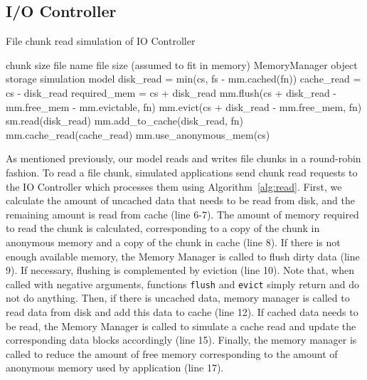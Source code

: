 \documentclass[conference]{IEEEtran}
\newcommand{\Desc}[2]{\State \makebox[2em][l]{#1}#2}
\begin{document}
    \subsection{I/O Controller}
     
    \begin{algorithm}\caption{File chunk read simulation of IO Controller}
    \label{alg:read}
        \small
        \begin{algorithmic}[1]
            \Input
                \Desc{cs}{chunk size}
                \Desc{fn}{file name}
                \Desc{fs}{file size (assumed to fit in memory)}
                \Desc{mm}{MemoryManager object}
                \Desc{sm}{storage simulation model}
               \EndInput
               \State disk\_read = min(cs, fs - mm.cached(fn)) 
               \State cache\_read = cs - disk\_read 
               \State required\_mem = cs + disk\_read
               \State mm.flush(cs + disk\_read - mm.free\_mem - mm.evictable, fn) 
               \State mm.evict(cs + disk\_read - mm.free\_mem, fn) 
                     
               \State sm.read(disk\_read)  
               \State mm.add\_to\_cache(disk\_read, fn)     
               \EndIf
                
               \State mm.cache\_read(cache\_read)  
            \EndIf
            \State mm.use\_anonymous\_mem(cs)
        \end{algorithmic}
    \end{algorithm}
    As mentioned previously, our model reads and writes file chunks in a
    round-robin fashion. To read a file chunk, simulated applications send
    chunk read requests to the IO Controller which processes them using
    Algorithm~\ref{alg:read}. First, we calculate the amount of uncached
    data that needs to be read from disk, and the remaining amount is read
    from cache (line 6-7). The amount of memory required to read the chunk
    is calculated, corresponding to a copy of the chunk in anonymous memory
    and a copy of the chunk in cache (line 8). 
    If there is not enough available memory, the Memory Manager is called
    to flush dirty data (line 9). If necessary, flushing is complemented by
    eviction (line 10). Note that, when called with negative arguments, functions
    \texttt{flush} and \texttt{evict} simply return and do not do anything. Then, if there is
    uncached data, memory manager is called to read data from disk and add this 
    data to cache (line 12).
    If cached data needs to be read, the Memory Manager is called to simulate 
    a cache read  and update the corresponding data blocks accordingly (line 15).
    Finally, the memory manager is called to reduce the amount of free memory 
    corresponding to the amount of anonymous memory used by application (line 17).
\end{document}
